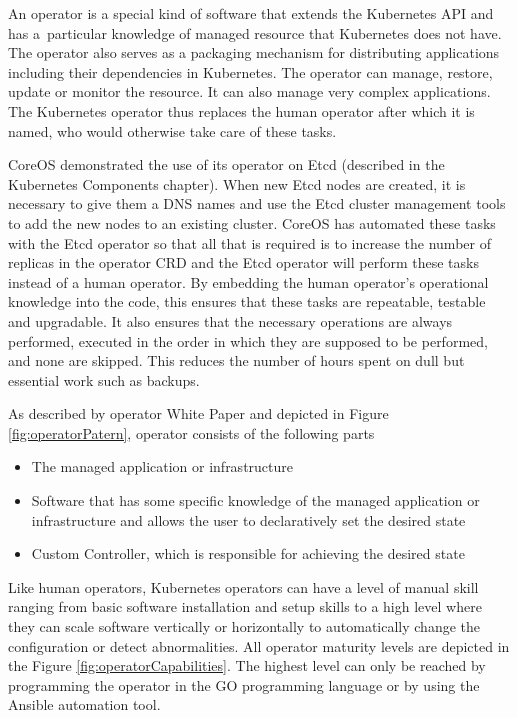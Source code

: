 An operator is a special kind of software that extends the Kubernetes API and has a particular knowledge of managed resource that Kubernetes does not have.
The operator also serves as a packaging mechanism for distributing applications including their dependencies in Kubernetes. The operator can manage, restore, update or monitor the resource. It can also manage very complex applications. The Kubernetes operator thus replaces the human operator after which it is named, who would otherwise take care of these tasks. \cite{operatorsPreface} \cite{IArchiveCOSoperators}


CoreOS demonstrated the use of its operator on Etcd (described in the Kubernetes Components chapter). When new Etcd nodes are created, it is necessary to give them a DNS names and use the Etcd cluster management tools to add the new nodes to an existing cluster. CoreOS has automated these tasks with the Etcd operator so that all that is required is to increase the number of replicas in the operator CRD and the Etcd operator will perform these tasks instead of a human operator. \cite{IArchiveCOSoperators}
By embedding the human operator's operational knowledge into the code, this ensures that these tasks are repeatable, testable and upgradable. It also ensures that the necessary operations are always performed, executed in the order in which they are supposed to be performed, and none are skipped. This reduces the number of hours spent on dull but essential work such as backups. \cite{operatorWhitepaper}

As described by operator White Paper \cite{operatorWhitepaper} and depicted in Figure \ref{fig:operatorPatern}, operator consists of the following parts
\begin{itemize}
    \item The managed application or infrastructure
    \item Software that has some specific knowledge of the managed application or infrastructure and allows the user to declaratively set the desired state
    \item Custom Controller, which is responsible for achieving the desired state
\end{itemize}


Like human operators, Kubernetes operators can have a level of manual skill ranging from basic software installation and setup skills to a high level where they can scale software vertically or horizontally to automatically change the configuration or detect abnormalities. All operator maturity levels are depicted in the Figure \ref{fig:operatorCapabilities}. The highest level can only be reached by programming the operator in the GO programming language or by using the Ansible automation tool. \cite{operatorsOframework}

